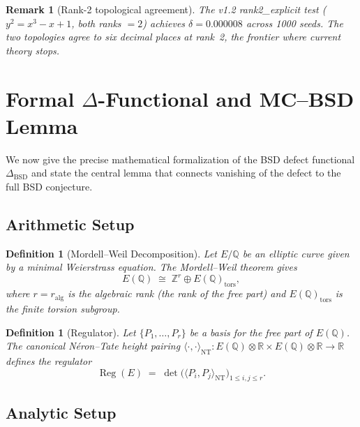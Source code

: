 \documentclass[11pt]{article}
\newtheorem{definition}[theorem]{Definition}
\newtheorem{remark}[theorem]{Remark}
\DeclareMathOperator{\Reg}{Reg}
\begin{document}
\begin{remark}[Rank-2 topological agreement]
The v1.2 rank2\_explicit test ($y^2 = x^3 - x + 1$, both ranks $= 2$)
achieves $\delta = 0.000008$ across 1000 seeds.  The two topologies
agree to six decimal places at rank~2, the frontier where current
theory stops.
\end{remark}

\section{Formal $\Delta$-Functional and MC--BSD Lemma}
\label{sec:delta-functional}

We now give the precise mathematical formalization of the BSD defect
functional $\Delta_{\mathrm{BSD}}$ and state the central lemma that
connects vanishing of the defect to the full BSD conjecture.

\subsection{Arithmetic Setup}

\begin{definition}[Mordell--Weil Decomposition]
\label{def:mw-decomp}
Let $E/\mathbb{Q}$ be an elliptic curve given by a minimal Weierstrass equation.
The Mordell--Weil theorem gives
\[
  E(\mathbb{Q}) \;\cong\; \mathbb{Z}^{r} \oplus E(\mathbb{Q})_{\mathrm{tors}},
\]
where $r = r_{\mathrm{alg}}$ is the \emph{algebraic rank} (the rank of the free
part) and $E(\mathbb{Q})_{\mathrm{tors}}$ is the finite torsion subgroup.
\end{definition}

\begin{definition}[Regulator]
\label{def:regulator}
Let $\{P_1, \ldots, P_r\}$ be a basis for the free part of $E(\mathbb{Q})$.
The canonical N\'{e}ron--Tate height pairing
$\langle \cdot, \cdot \rangle_{\mathrm{NT}} \colon E(\mathbb{Q}) \otimes
\mathbb{R} \times E(\mathbb{Q}) \otimes \mathbb{R} \to \mathbb{R}$
defines the \emph{regulator}
\[
  \Reg(E) \;=\; \det\!\bigl(\langle P_i, P_j \rangle_{\mathrm{NT}}\bigr)_{1 \le i,j \le r}.
\]
\end{definition}

\subsection{Analytic Setup}
\end{document}
